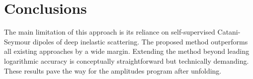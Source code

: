 \section{Conclusions}\label{sec:conclusions}

The main limitation of this approach is its reliance on self-supervised
Catani-Seymour dipoles of deep inelastic scattering. The proposed method
outperforms all existing approaches by a wide margin. Extending the
method beyond leading logarithmic accuracy is conceptually
straightforward but technically demanding. These results pave the way
for the amplitudes program after unfolding.

